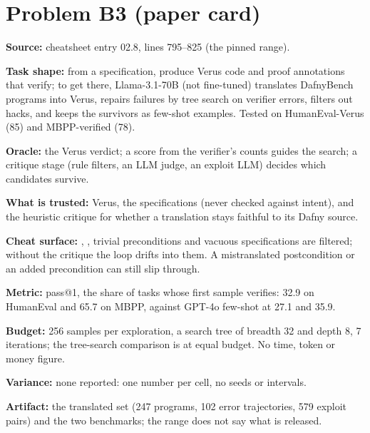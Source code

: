 \documentclass[11pt]{article}
\begin{document}
\section*{Problem B3 (paper card)}\label{ans:B3}
\begin{answer}
\textbf{Source:} cheatsheet entry 02.8, lines 795--825 (the pinned range).

\textbf{Task shape:} from a specification, produce Verus code and proof
annotations that verify; to get there, Llama-3.1-70B (not fine-tuned)
translates DafnyBench programs into Verus, repairs failures by tree search on
verifier errors, filters out hacks, and keeps the survivors as few-shot
examples. Tested on HumanEval-Verus (85) and MBPP-verified (78).

\textbf{Oracle:} the Verus verdict; a score from the verifier's counts guides
the search; a critique stage (rule filters, an LLM judge, an exploit LLM)
decides which candidates survive.

\textbf{What is trusted:} Verus, the specifications (never checked against
intent), and the heuristic critique for whether a translation stays faithful
to its Dafny source.

\textbf{Cheat surface:} , ,
trivial preconditions and vacuous specifications are filtered; without the
critique the loop drifts into them. A mistranslated postcondition or an added
precondition can still slip through.

\textbf{Metric:} pass@1, the share of tasks whose first sample verifies:
32.9 on HumanEval and 65.7 on MBPP, against GPT-4o few-shot at 27.1 and 35.9.

\textbf{Budget:} 256 samples per exploration, a search tree of breadth 32 and
depth 8, 7 iterations; the tree-search comparison is at equal budget. No time,
token or money figure.

\textbf{Variance:} none reported: one number per cell, no seeds or intervals.

\textbf{Artifact:} the translated set (247 programs, 102 error trajectories,
579 exploit pairs) and the two benchmarks; the range does not say what is
released.
\end{answer}
\end{document}
